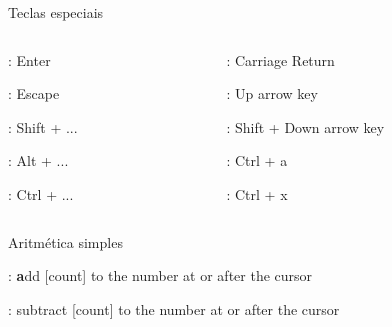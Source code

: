 \begin{frame}{Teclas especiais}
    \begin{columns}
        \begin{column}{0.35\textwidth}
            \begin{widedescription}
                \item {}: Enter
                \item {}: Escape
                \item {}: Shift + ...
                \item {}: Alt + ...
                \item {}: Ctrl + ...
            \end{widedescription}
        \end{column}
        
        \begin{column}{0.65\textwidth}
            \begin{widedescription}
                \item {}: Carriage Return
                \item {}: Up arrow key
                \item {}: Shift + Down arrow key
                \item {}: Ctrl + a
                \item {}: Ctrl + x
            \end{widedescription}
        \end{column}
    \end{columns}
\end{frame}

\begin{frame}{Aritmética simples}
    \begin{widedescription}
        \item {}: \textbf{a}dd [count] to the number at or after the cursor
        \item {}: subtract [count] to the number at or after the cursor
    \end{widedescription}
\end{frame}
